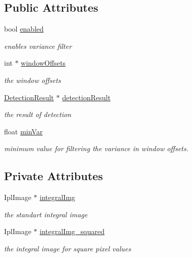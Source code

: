 \subsection*{Public Attributes}
\begin{DoxyCompactItemize}
\item 
bool \hyperlink{classtld_1_1VarianceFilter_a07f3cd680554508eb6effc4c4b92c322}{enabled}
\begin{DoxyCompactList}\small\item\em enables variance filter \end{DoxyCompactList}\item 
int $\ast$ \hyperlink{classtld_1_1VarianceFilter_a2c8913adc5862adf9eb3034b81c1f02b}{window\-Offsets}
\begin{DoxyCompactList}\small\item\em the window offsets \end{DoxyCompactList}\item 
\hyperlink{classtld_1_1DetectionResult}{Detection\-Result} $\ast$ \hyperlink{classtld_1_1VarianceFilter_a21c300c5f491726705f82429e919ccd9}{detection\-Result}
\begin{DoxyCompactList}\small\item\em the result of detection \end{DoxyCompactList}\item 
float \hyperlink{classtld_1_1VarianceFilter_ad5fd1b805c1cb461a31f61dd6fdb8f07}{min\-Var}
\begin{DoxyCompactList}\small\item\em minimum value for filtering the variance in window offsets. \end{DoxyCompactList}\end{DoxyCompactItemize}
\subsection*{Private Attributes}
\begin{DoxyCompactItemize}
\item 
Ipl\-Image $\ast$ \hyperlink{classtld_1_1VarianceFilter_acec215a321ba79cb9489f49e9e358d9a}{integral\-Img}
\begin{DoxyCompactList}\small\item\em the standart integral image \end{DoxyCompactList}\item 
Ipl\-Image $\ast$ \hyperlink{classtld_1_1VarianceFilter_af03a14687ee0595c0d145f1856e302ef}{integral\-Img\-\_\-squared}
\begin{DoxyCompactList}\small\item\em the integral image for square pixel values \end{DoxyCompactList}\end{DoxyCompactItemize}



